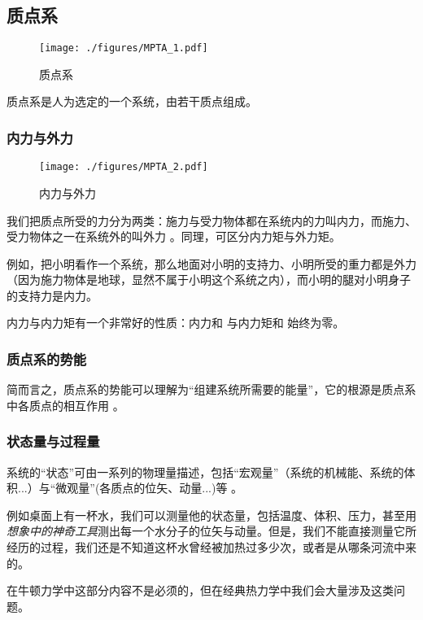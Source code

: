 
\subsection{质点系}
\begin{figure}[ht]
\centering
\texttt{[image: ./figures/MPTA\_1.pdf]}
\caption{质点系} \label{MPTA_fig1}
\end{figure}
质点系是人为选定的一个系统，由若干质点组成。

\subsubsection{内力与外力}
\begin{figure}[ht]
\centering
\texttt{[image: ./figures/MPTA\_2.pdf]}
\caption{内力与外力} \label{MPTA_fig2}
\end{figure}
我们把质点所受的力分为两类：施力与受力物体都在系统内的力叫内力，而施力、受力物体之一在系统外的叫外力 。同理，可区分内力矩与外力矩。

例如，把小明看作一个系统，那么地面对小明的支持力、小明所受的重力都是外力（因为施力物体是地球，显然不属于小明这个系统之内），而小明的腿对小明身子的支持力是内力。

内力与内力矩有一个非常好的性质：内力和 与内力矩和 始终为零。

\subsubsection{质点系的势能}
简而言之，质点系的势能可以理解为“组建系统所需要的能量”，它的根源是质点系中各质点的相互作用 。

\subsubsection{状态量与过程量}
系统的“状态”可由一系列的物理量描述，包括“宏观量”（系统的机械能、系统的体积...）与“微观量”(各质点的位矢、动量...)等 。

例如桌面上有一杯水，我们可以测量他的状态量，包括温度、体积、压力，甚至用\textsl{想象中的神奇工具}测出每一个水分子的位矢与动量。但是，我们不能直接测量它所经历的过程，我们还是不知道这杯水曾经被加热过多少次，或者是从哪条河流中来的。

在牛顿力学中这部分内容不是必须的，但在经典热力学中我们会大量涉及这类问题。

